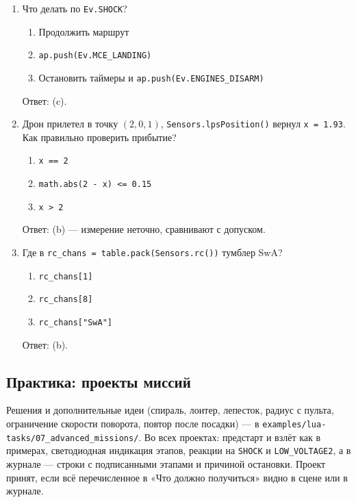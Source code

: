 \begin{enumerate}
    \begin{enumerate}[label=(\alph*)] \item \texttt{while true do ap.goToLocalPoint(...) end} \item \texttt{Timer.new(0.1, function() ap.goToLocalPoint(...) end)} \item \texttt{repeat ... until false} \end{enumerate}
    Ответ: (b).
  \item Что делать по \verb|Ev.SHOCK|?
    \begin{enumerate}[label=(\alph*)] \item Продолжить маршрут \item \verb|ap.push(Ev.MCE_LANDING)| \item Остановить таймеры и \verb|ap.push(Ev.ENGINES_DISARM)| \end{enumerate}
    Ответ: (c).
  \item Дрон прилетел в точку $(2, 0, 1)$, \verb|Sensors.lpsPosition()| вернул \verb|x = 1.93|. Как правильно проверить прибытие?
    \begin{enumerate}[label=(\alph*)] \item \verb|x == 2| \item \verb|math.abs(2 - x) <= 0.15| \item \verb|x > 2| \end{enumerate}
    Ответ: (b) --- измерение неточно, сравнивают с допуском.
  \item Где в \verb|rc_chans = table.pack(Sensors.rc())| тумблер SwA?
    \begin{enumerate}[label=(\alph*)] \item \verb|rc_chans[1]| \item \verb|rc_chans[8]| \item \verb|rc_chans["SwA"]| \end{enumerate}
    Ответ: (b).
\end{enumerate}

\subsection{Практика: проекты миссий}

Решения и дополнительные идеи (спираль, лоитер, лепесток, радиус с пульта, ограничение скорости поворота, повтор после посадки) --- в \texttt{examples/lua-tasks/07\_advanced\_missions/}. Во всех проектах: предстарт и взлёт как в примерах, светодиодная индикация этапов, реакции на \verb|SHOCK| и \verb|LOW_VOLTAGE2|, а в журнале --- строки с подписанными этапами и причиной остановки. Проект принят, если всё перечисленное в «Что должно получиться» видно в сцене или в журнале.

